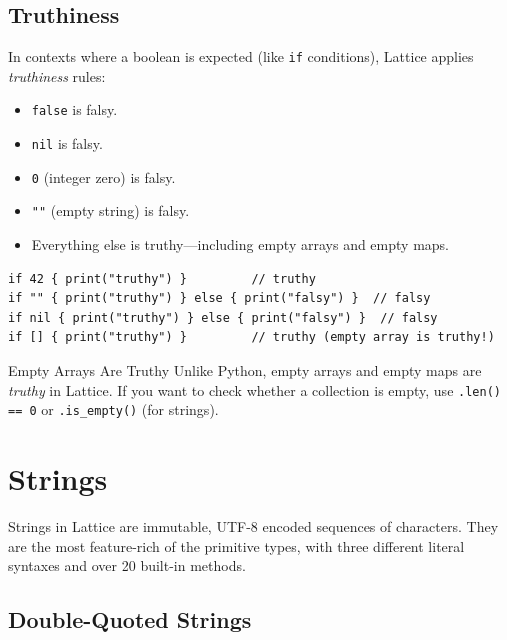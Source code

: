 \subsection{Truthiness}\label{subsec:truthiness}

In contexts where a boolean is expected (like \lstinline|if| conditions), Lattice applies \emph{truthiness} rules:

\begin{itemize}
  \item \lstinline|false| is falsy.
  \item \lstinline|nil| is falsy.
  \item \lstinline|0| (integer zero) is falsy.
  \item \lstinline|""| (empty string) is falsy.
  \item Everything else is truthy---including empty arrays and empty maps.
\end{itemize}

\begin{lstlisting}[language=Lattice, caption={Truthiness in action}]
if 42 { print("truthy") }         // truthy
if "" { print("truthy") } else { print("falsy") }  // falsy
if nil { print("truthy") } else { print("falsy") }  // falsy
if [] { print("truthy") }         // truthy (empty array is truthy!)
\end{lstlisting}

\begin{warnbox}{Empty Arrays Are Truthy}
Unlike Python, empty arrays and empty maps are \emph{truthy} in Lattice.
If you want to check whether a collection is empty, use \lstinline|.len() == 0| or \lstinline|.is_empty()| (for strings).
\end{warnbox}

\section{Strings}\label{sec:strings}

Strings in Lattice are immutable, UTF-8 encoded sequences of characters.
They are the most feature-rich of the primitive types, with three different literal syntaxes and over 20 built-in methods.

\subsection{Double-Quoted Strings}\label{subsec:double-strings}

